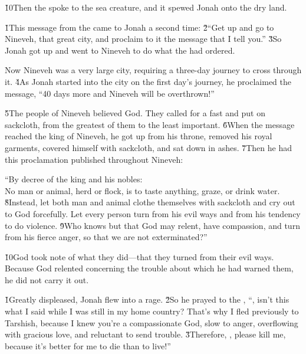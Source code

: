 \v{10}Then the  spoke to the sea creature, and it spewed Jonah onto the dry land.

\v{1}This message from the  came to Jonah a second time: \v{2}``Get up and go to Nineveh, that great city, and proclaim to it the message that I tell you.'' \v{3}So Jonah got up and went to Nineveh to do what the  had ordered.

Now Nineveh was a very large city, requiring a three-day journey to cross through it. \v{4}As Jonah started into the city on the first day's journey, he proclaimed the message, ``40 days more and Nineveh will be overthrown!''

\v{5}The people of Nineveh believed God. They called for a fast and put on sackcloth, from the greatest of them to the least important. \v{6}When the message reached the king of Nineveh, he got up from his throne, removed his royal garments, covered himself with sackcloth, and sat down in ashes. \v{7}Then he had this proclamation published throughout Nineveh:

\begin{poetry}
\poeml ``By decree of the king and his nobles: \\
\poeml No man or animal, herd or flock, is to taste anything, graze, or drink water. \v{8}Instead, let both man and animal clothe themselves with sackcloth and cry out to God forcefully. Let every person turn from his evil ways and from his tendency to do violence. \v{9}Who knows but that God may relent, have compassion, and turn from his fierce anger, so that we are not exterminated?''
\end{poetry}

\v{10}God took note of what they did---that they turned from their evil ways. Because God relented concerning the trouble about which he had warned them, he did not carry it out.

\v{1}Greatly displeased, Jonah flew into a rage. \v{2}So he prayed to the , ``, isn't this what I said while I was still in my home country? That's why I fled previously to Tarshish, because I knew you're a compassionate God, slow to anger, overflowing with gracious love, and reluctant to send trouble. \v{3}Therefore, , please kill me, because it's better for me to die than to live!''

